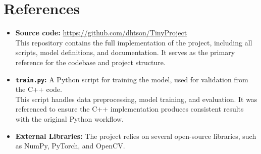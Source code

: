 \appendix
\chapter*{References}

\sloppy

\begin{itemize}
    \item \textbf{Source code:} \url{https://github.com/dhtson/TinyProject} \\
        This repository contains the full implementation of the project, including all scripts, model definitions, and documentation. It serves as the primary reference for the codebase and project structure.
    \item \textbf{\texttt{train.py}:} A Python script for training the model, used for validation from the C++ code. \\
        This script handles data preprocessing, model training, and evaluation. It was referenced to ensure the C++ implementation produces consistent results with the original Python workflow.
    \item \textbf{External Libraries:} The project relies on several open-source libraries, such as NumPy, PyTorch, and OpenCV.
\end{itemize}
